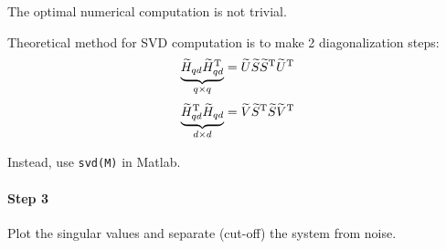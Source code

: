 \begin{remark}
    The optimal numerical computation is not trivial. 

    Theoretical method for SVD computation is to make 2 diagonalization steps:
    \[
        \underbrace{\widetilde{H}_{qd} \widetilde{H}_{qd}^{\mathrm{T}}}_{q\times q} = \widetilde{U}\widetilde{S}\widetilde{S}^{\mathrm{T}}\widetilde{U}^{\mathrm{T}}
    \]
    \[
        \underbrace{\widetilde{H}_{qd}^{\mathrm{T}} \widetilde{H}_{qd}}_{d\times d} = \widetilde{V}\widetilde{S}^{\mathrm{T}}\widetilde{S}\widetilde{V}^{\mathrm{T}}
    \]
    
    Instead, use \texttt{svd(M)} in Matlab.
\end{remark}

\paragraph{Step 3} Plot the singular values and separate (cut-off) the system from noise.

